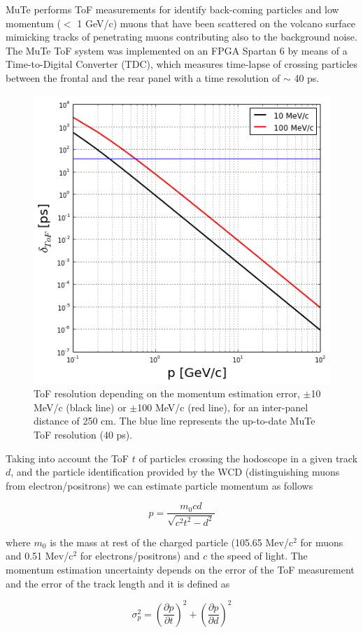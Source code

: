 \documentclass[letterpaper,11pt]{article}
\begin{document}
MuTe performs ToF measurements for identify back-coming particles and low momentum ($<$ 1 GeV/c) muons that have been scattered on the volcano surface mimicking tracks of penetrating muons contributing also to the background noise. The MuTe ToF system was implemented on an FPGA Spartan 6 by means of a Time-to-Digital Converter (TDC), which measures time-lapse of crossing particles between the frontal and the rear panel with a time resolution of $\sim$ 40 ps. 

\begin{figure}[htb]
\centering
\includegraphics[width=0.5\columnwidth]{Figures/ToF_Resolution_250cm.png}
\caption{ToF resolution depending on the momentum estimation error, $\pm$10 MeV/c (black line) or $\pm$100 MeV/c (red line), for an inter-panel distance of 250 cm. The blue line represents the up-to-date MuTe ToF resolution (40 ps).}
\label{fig:ToF_Resolution}
\end{figure}


Taking into account the ToF $t$ of particles crossing the hodoscope in a given track $d$, and the particle identification provided by the WCD (distinguishing muons from electron/positrons) we can estimate particle momentum as follows

\begin{equation}
p = \frac{m_0 c d}{\sqrt{c^2t^2-d^2}}
\end{equation}

where $m_0$ is the mass at rest of the charged particle (105.65 Mev/c$^2$ for muons and 0.51 Mev/c$^2$ for electrons/positrons) and $c$ the speed of light. The momentum estimation uncertainty depends on the error of the ToF measurement and the error of the track length and it is defined as

\begin{equation}
\sigma_p^2 = \left( \frac{\partial p}{\partial t} \right)^2 + \left( \frac{\partial p}{\partial d} \right)^2
\end{equation}
\end{document}
